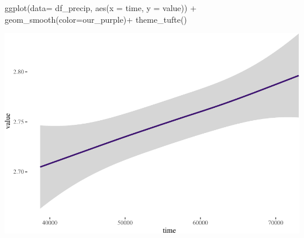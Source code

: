 \documentclass[
  paper=a4,
  ,captions=tableheading
]{scrartcl}
\newenvironment{Shaded}{\begin{snugshade}}{\end{snugshade}}
\newcommand{\AttributeTok}[1]{\textcolor[rgb]{0.77,0.63,0.00}{#1}}
\newcommand{\FunctionTok}[1]{\textcolor[rgb]{0.00,0.00,0.00}{#1}}
\newcommand{\NormalTok}[1]{#1}
\newcommand{\SpecialCharTok}[1]{\textcolor[rgb]{0.00,0.00,0.00}{#1}}
\begin{document}
\begin{Shaded}
\begin{Highlighting}[]
\FunctionTok{ggplot}\NormalTok{(}\AttributeTok{data=}\NormalTok{ df\_precip, }\FunctionTok{aes}\NormalTok{(}\AttributeTok{x =}\NormalTok{ time, }\AttributeTok{y =}\NormalTok{ value)) }\SpecialCharTok{+} 
     \FunctionTok{geom\_smooth}\NormalTok{(}\AttributeTok{color=}\NormalTok{our\_purple)}\SpecialCharTok{+}
  \FunctionTok{theme\_tufte}\NormalTok{()}
\end{Highlighting}
\end{Shaded}

\includegraphics{Haskell_files/figure-latex/unnamed-chunk-47-2.pdf}
\end{document}

